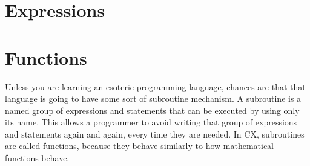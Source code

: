 \documentclass[11pt,fleqn,openany]{book} %
\begin{document}

\chapter{Expressions}
\label{chapter:expressions}



\chapter{Functions}
\label{chapter:functions}


Unless you are learning an esoteric programming language, chances are that that language is going to have some sort of subroutine mechanism. A subroutine is a named group of expressions and statements that can be executed by using only its name. This allows a programmer to avoid writing that group of expressions and statements again and again, every time they are needed. In CX, subroutines are called functions, because they behave similarly to how mathematical functions behave.
\end{document}
